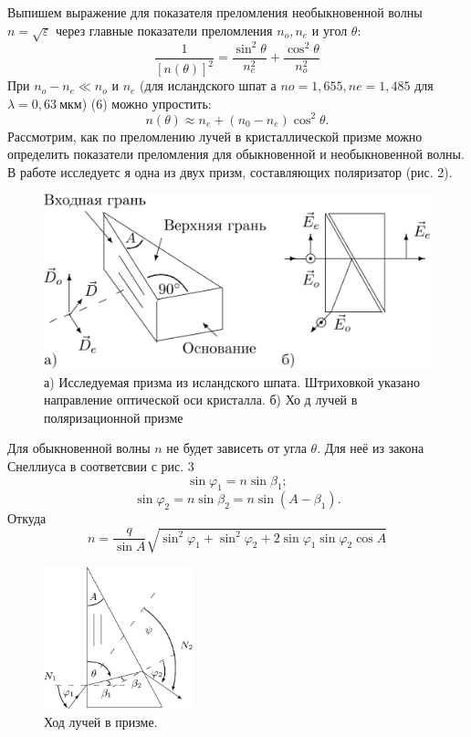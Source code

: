 \documentclass[journal, a4paper]{IEEEtran}
\begin{document}
Выпишем выражение для показателя преломления необыкновенной
волны
$n=\sqrt{\varepsilon}$ через главные показатели преломления
$n_o, n_e$ и угол $\theta$:
\begin{equation}
\frac{1}{\left[n(\theta)\right]^2}=
\frac{\sin^2{\theta}}{n_e^2}+
\frac{\cos^2{\theta}}{n_o^2}
\end{equation}
При $n_o - n_e \ll n_o$ и
$n_e$ (для исландского шпат
а
$no = 1,655, ne = 1,485$
для $\lambda= 0,63~\text{мкм}$) (6) можно упростить:
\begin{equation}
n(\theta)\approx n_e + (n_0-n_e)\cos^2{\theta}.
\end{equation}
Рассмотрим,
как по преломлению лучей в кристаллической призме можно
определить показатели преломления для обыкновенной
и необыкновенной волны.
В работе исследуетс
я одна из двух призм, составляющих
поляризатор (рис. 2).
\begin{figure}[h!]
\includegraphics[scale=0.36]{fig2}
\caption{а) Исследуемая призма из исландского шпата.
Штриховкой указано направление оптической оси кристалла. б) Хо
д лучей в поляризационной призме
}
\end{figure}
Для обыкновенной волны
$n$ не будет зависеть от угла $\theta$. Для неё из закона Снеллиуса в соответсвии с рис. 3 
\[
\sin\varphi_1=n\sin\beta_1;
\]
\[\sin\varphi_2=n\sin\beta_2=n\sin{(A-\beta_1)}.\]
Откуда 
\begin{equation}
n=\frac{q}{\sin A}\sqrt{\sin^2\varphi_1 + \sin^2{\varphi_2}+2\sin{\varphi_1}\sin{\varphi_2}\cos{A}}
\end{equation}
\begin{figure}
\includegraphics[width=4.3cm]{fig3}
\caption{Ход лучей в призме.}
\end{figure}
\end{document}
